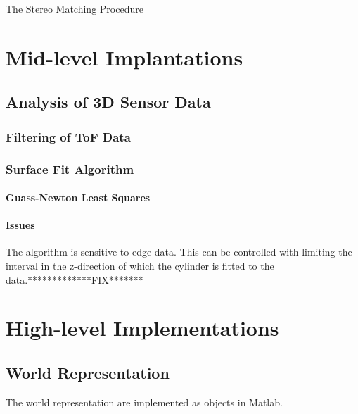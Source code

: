 \begin{algorithm}
\caption{The Stereo Matching Procedure}
    \begin{algorithmic}
    


    \end{algorithmic}
\end{algorithm}


\section{Mid-level Implantations}



\subsection{Analysis of 3D Sensor Data}



\subsubsection{Filtering of ToF Data}


\subsubsection{Surface Fit Algorithm}


\paragraph{Guass-Newton Least Squares}


\paragraph{Issues}
The algorithm is sensitive to edge data. This can be controlled with limiting the interval
in the z-direction of which the cylinder is fitted to the data.*************FIX*******


\section{High-level Implementations}

\subsection{World Representation}
The world representation are implemented as objects in Matlab.




